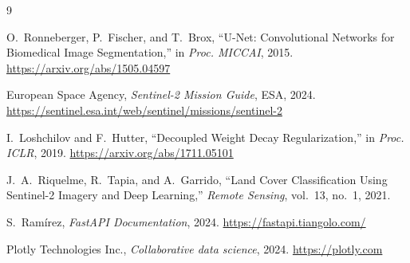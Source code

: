 \documentclass[12pt, a4paper]{article}
\begin{document}
\newpage
\begin{thebibliography}{9}

O.~Ronneberger, P.~Fischer, and T.~Brox,
``U-Net: Convolutional Networks for Biomedical Image Segmentation,''
in \textit{Proc. MICCAI}, 2015.
\url{https://arxiv.org/abs/1505.04597}

European Space Agency,
\textit{Sentinel-2 Mission Guide},
ESA, 2024.
\url{https://sentinel.esa.int/web/sentinel/missions/sentinel-2}

I.~Loshchilov and F.~Hutter,
``Decoupled Weight Decay Regularization,''
in \textit{Proc. ICLR}, 2019.
\url{https://arxiv.org/abs/1711.05101}

J.~A.~Riquelme, R.~Tapia, and A.~Garrido,
``Land Cover Classification Using Sentinel-2 Imagery and Deep Learning,''
\textit{Remote Sensing}, vol.~13, no.~1, 2021.

S.~Ram\'{i}rez,
\textit{FastAPI Documentation},
2024.
\url{https://fastapi.tiangolo.com/}

Plotly Technologies Inc.,
\textit{Collaborative data science},
2024.
\url{https://plotly.com}

\end{thebibliography}
\end{document}
